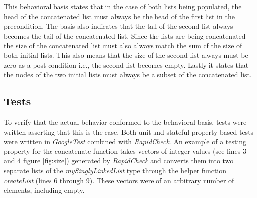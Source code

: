 This behavioral basis states that in the case of both lists being populated, the head of the concatenated list must always be the head of the first list in the precondition. The basis also indicates that the tail of the second list always becomes the tail of the concatenated list. Since the lists are being concatenated the size of the concatenated list must also always match the sum of the size of both initial lists. This also means that the size of the second list always must be zero as a post condition i.e., the second list becomes empty. Lastly it states that the nodes of the two initial lists must always be a subset of the concatenated list.

\subsection{Tests}

To verify that the actual behavior conformed to the behavioral basis, tests were written asserting that this is the case. Both unit and stateful property-based tests were written in \textit{GoogleTest} combined with \textit{RapidCheck}. An example of a testing property for the concatenate function takes vectors of integer values (see lines 3 and 4 figure \ref{fig:size}) generated by \textit{RapidCheck} and converts them into two separate lists of the \textit{mySinglyLinkedList} type through the helper function \textit{createList} (lines 6 through 9). These vectors were of an arbitrary number of elements, including empty. 

